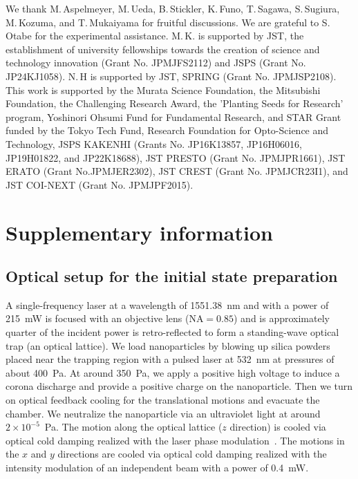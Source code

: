 \documentclass[aps, prl, 
amsmath, showpacs, preprintnumbers, twocolumn, amssymb, amsmath, superscriptaddress]{revtex4-1}
\begin{document}
\begin{acknowledgments}
We thank M.\,Aspelmeyer, M.\,Ueda, B.\,Stickler, K.\,Funo, T.\,Sagawa, S.\,Sugiura, M.\,Kozuma, and T.\,Mukaiyama for fruitful discussions. We are grateful to S.\,Otabe for the experimental assistance. M.\,K. is supported by JST, the establishment of university fellowships towards the creation of science and technology innovation (Grant No. JPMJFS2112) and JSPS (Grant No. JP24KJ1058). N.\,H is supported by JST, SPRING (Grant No. JPMJSP2108). This work is supported by the Murata Science Foundation, the Mitsubishi Foundation, the Challenging Research Award, the 'Planting Seeds for Research' program, Yoshinori Ohsumi Fund for Fundamental Research, and STAR Grant funded by the Tokyo Tech Fund, Research Foundation for Opto-Science and Technology, JSPS KAKENHI (Grants No. JP16K13857, JP16H06016, JP19H01822, and JP22K18688), JST PRESTO (Grant No. JPMJPR1661), JST ERATO (Grant No.JPMJER2302), JST CREST (Grant No. JPMJCR23I1), and JST COI-NEXT (Grant No. JPMJPF2015).
\end{acknowledgments}



\section{Supplementary information}
\subsection{Optical setup for the initial state preparation}

A single-frequency laser at a wavelength of 1551.38~nm and with a power of 215~mW is focused with an objective lens (NA$=0.85$) and is approximately quarter of the incident power is retro-reflected to form a standing-wave optical trap (an optical lattice).  We load nanoparticles by blowing up silica powders placed near the trapping region with a pulsed laser at 532~nm at pressures of about 400~Pa. At around 350~Pa, we apply a positive high voltage to induce a corona discharge and provide a positive charge on the nanoparticle. Then we turn on optical feedback cooling for the translational motions and evacuate the chamber. We neutralize the nanoparticle via an ultraviolet light at around $2 \times 10^{-5}$~Pa. The motion along the optical lattice ($z$ direction) is cooled via optical cold damping realized with  the laser phase modulation~\cite{kamba2022optical}. The motions in the $x$ and $y$ directions are cooled via optical cold damping realized with the intensity modulation of an independent beam with a power of 0.4~mW.  
\end{document}
